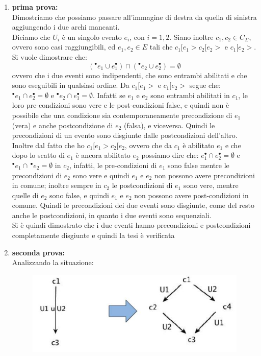 \begin{enumerate}
  \item \textbf{prima prova:}\\
  Dimostriamo che possiamo passare all'immagine di destra da quella di sinistra aggiungendo i due archi mancanti.\\ Diciamo che $U_i$ è un singolo evento $e_i$, con $i=1,2$. Siano inoltre $c_1,c_2\in C_\Sigma$, ovvero sono casi raggiungibili, ed $e_1,e_2\in E$ tali che $c_1 [e_1 > c_2 [e_2 > \mbox{ e } c_1 [e_2 >$. Si vuole dimostrare che: \[(^\bullet e_1\cup e_1^\bullet)\cap(^\bullet e_2\cup e_2^\bullet)=\emptyset\] ovvero che i due eventi sono indipendenti, che sono entrambi abilitati e che sono eseguibili in qualsiasi ordine. 
  Da $c_1 [e_1 > \mbox{ e }c_1 [e_2 >$ segue che:  $^\bullet e_1\cap e_2^\bullet=\emptyset$ e $^\bullet e_2\cap e_1^\bullet=\emptyset$. Infatti se $e_1$ e $e_2$ sono entrambi abilitati in $c_1$, le loro pre-condizioni sono vere e le post-condizioni false, e quindi non è possibile che una condizione sia contemporaneamente precondizione di $e_1$ (vera) e anche postcondizione di $e_2$ (falsa), e viceversa. Quindi le precondizioni di un evento sono disgiunte dalle postcondizioni dell'altro.\\ Inoltre dal fatto che ho $c_1 [e_1 > c_2 [e_2$, ovvero che da $c_1$ è abilitato $e_1$ e che dopo lo scatto di $e_1$ è ancora abilitato $e_2$ possiamo dire che: $e_1^\bullet\cap e_2^\bullet=\emptyset$ e $^\bullet e_1\cap\, ^\bullet e_2=\emptyset$  in $c_2$, infatti, le pre-condizioni di $e_1$ sono false mentre le precondizioni di $e_2$ sono vere e quindi $e_1$ e $e_2$ non possono avere precondizioni in comune; inoltre sempre in $c_2$ le postcondizioni di $e_1$ sono vere, mentre quelle di $e_2$ sono false, e quindi $e_1$ e $e_2$ non possono avere post-condizioni in comune. Quindi le precondizioni dei due eventi sono disgiunte, come del resto anche le postcondizioni, in quanto i due eventi sono sequenziali.\\ Si è quindi dimostrato che i due eventi hanno precondizioni e postcondizioni completamente disgiunte e quindi la tesi è verificata
  \item \textbf{seconda prova:}\\
  Analizzando la situazione:
  \begin{figure}[H]
    \centering
    \includegraphics[scale = 0.45]{IMM/diam2.jpg}

\end{figure}
\end{enumerate}
